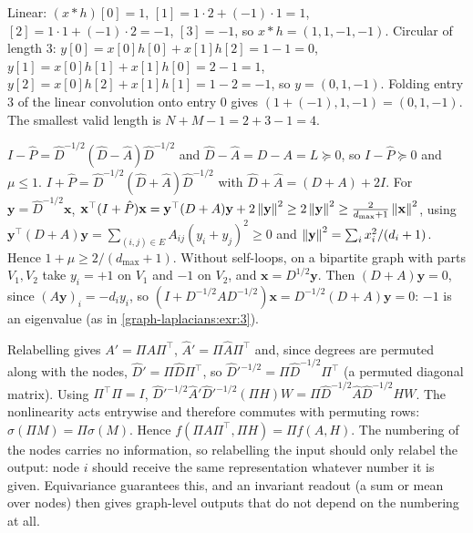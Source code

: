 Linear: $(x*h)[0] = 1$, $[1] = 1\cdot2 + (-1)\cdot1 = 1$, $[2] = 1\cdot1 + (-1)\cdot2 = -1$, $[3] = -1$, so $x * h = (1, 1, -1, -1)$.
Circular of length $3$: $y[0] = x[0]h[0] + x[1]h[2] = 1 - 1 = 0$, $y[1] = x[0]h[1] + x[1]h[0] = 2 - 1 = 1$, $y[2] = x[0]h[2] + x[1]h[1] = 1 - 2 = -1$, so $y = (0, 1, -1)$. Folding entry $3$ of the linear convolution onto entry $0$ gives $(1 + (-1), 1, -1) = (0, 1, -1)$. The smallest valid length is $N + M - 1 = 2 + 3 - 1 = 4$.

$I - \hat P = \hat D^{-1/2}(\hat D - \hat A)\hat D^{-1/2}$ and $\hat D - \hat A = D - A = L \succeq 0$, so $I - \hat P \succeq 0$ and $\mu \le 1$.
$I + \hat P = \hat D^{-1/2}(\hat D + \hat A)\hat D^{-1/2}$ with $\hat D + \hat A = (D + A) + 2I$. For $\mathbf y = \hat D^{-1/2}\mathbf x$,
$\mathbf x^\top(I + \hat P)\mathbf x = \mathbf y^\top(D + A)\mathbf y + 2\left\|\mathbf y\right\|^2 \ge 2\left\|\mathbf y\right\|^2 \ge \frac{2}{d_{\max}+1}\left\|\mathbf x\right\|^2$,
using $\mathbf y^\top(D + A)\mathbf y = \sum_{(i,j)\in E}A_{ij}(y_i + y_j)^2 \ge 0$ and $\left\|\mathbf y\right\|^2 = \sum_i x_i^2/(d_i + 1)$. Hence $1 + \mu \ge 2/(d_{\max} + 1)$.
Without self-loops, on a bipartite graph with parts $V_1, V_2$ take $y_i = +1$ on $V_1$ and $-1$ on $V_2$, and $\mathbf x = D^{1/2}\mathbf y$. Then $(D + A)\mathbf y = 0$, since $(A\mathbf y)_i = -d_iy_i$, so $(I + D^{-1/2}AD^{-1/2})\mathbf x = D^{-1/2}(D + A)\mathbf y = 0$: $-1$ is an eigenvalue (as in \cref{graph-laplacians:exr:3}).

Relabelling gives $A' = \Pi A\Pi^\top$, $\hat A' = \Pi\hat A\Pi^\top$ and, since degrees are permuted along with the nodes, $\hat D' = \Pi\hat D\Pi^\top$, so $\hat D'^{-1/2} = \Pi\hat D^{-1/2}\Pi^\top$ (a permuted diagonal matrix). Using $\Pi^\top\Pi = I$,
$\hat D'^{-1/2}\hat A'\hat D'^{-1/2}(\Pi H)W = \Pi\hat D^{-1/2}\hat A\hat D^{-1/2}HW$.
The nonlinearity acts entrywise and therefore commutes with permuting rows: $\sigma(\Pi M) = \Pi\sigma(M)$. Hence $f(\Pi A\Pi^\top, \Pi H) = \Pi f(A, H)$.
The numbering of the nodes carries no information, so relabelling the input should only relabel the output: node $i$ should receive the same representation whatever number it is given. Equivariance guarantees this, and an invariant readout (a sum or mean over nodes) then gives graph-level outputs that do not depend on the numbering at all.

\section{}

